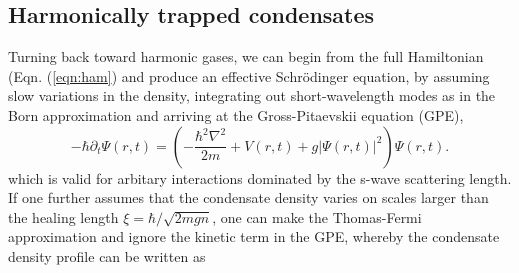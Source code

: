 	




\subsection*{Harmonically trapped condensates}

	Turning back toward harmonic gases, we can begin from the full Hamiltonian (Eqn. (\ref{eqn:ham}) and produce an effective Schr\"{o}dinger equation, by assuming slow variations in the density, integrating out short-wavelength modes as in the Born approximation and arriving at the Gross-Pitaevskii equation (GPE),
	\begin{equation}
		-\hbar\partial_t\Psi(r,t) = \left(-\frac{\hbar^2\nabla^2}{2m} + V(r,t) + g|\Psi(r,t)|^2\right)\Psi(r,t).
		\label{eqn:GPE}
	\end{equation}
	which is valid for arbitary interactions dominated by the s-wave scattering length. If one further assumes that the condensate density varies on scales larger than the healing length $\xi = \hbar/\sqrt{2mgn}$, one can make the Thomas-Fermi approximation and ignore the kinetic term in the GPE, whereby the condensate density profile can be written as

